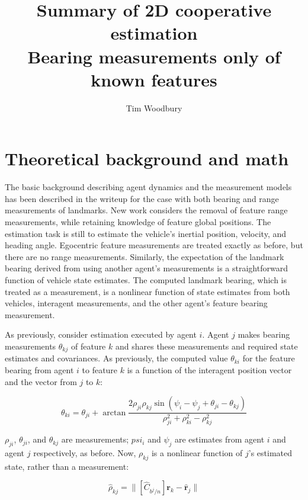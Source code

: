 \documentclass{aiaa-tc}
\title{Summary of 2D cooperative estimation \\ \large{Bearing measurements only of known features}}
\author{Tim Woodbury}
\newcommand{\B}[1]{\textbf{#1}} %
\begin{document}
\maketitle

\section{Theoretical background and math}

The basic background describing agent dynamics and the measurement models has been described in the writeup for the case with both bearing and range measurements of landmarks. New work considers the removal of feature range measurements, while retaining knowledge of feature global positions. The estimation task is still to estimate the vehicle's inertial position, velocity, and heading angle. Egocentric feature measurements are treated exactly as before, but there are no range measurements. Similarly, the expectation of the landmark bearing derived from using another agent's measurements is a straightforward function of vehicle state estimates. The computed landmark bearing, which is treated as a measurement, is a nonlinear function of state estimates from both vehicles, interagent measurements, and the other agent's feature bearing measurement.

As previously, consider estimation executed by agent $i$. Agent $j$ makes bearing measurements $\theta_{kj}$ of feature $k$ and shares these measurements and required state estimates and covariances. As previously, the computed value $\theta_{ki}$ for the feature bearing from agent $i$ to feature $k$ is a function of the interagent position vector and the vector from $j$ to $k$:

\begin{equation}
\theta_{ki} = \theta_{ji} + \arctan{\frac{ 2\rho_{ji}\rho_{kj}\sin{(\psi_i - \psi_j + \theta_{ji} - \theta_{kj})} }{ \rho_{ji}^2 + \rho_{ki}^2 - \rho_{kj}^2 } }
\label{eq:thetaki}
\end{equation}

$\rho_{ji}$, $\theta_{ji}$, and $\theta_{kj}$ are measurements; $psi_i$ and $\psi_j$ are estimates from agent $i$ and agent $j$ respectively, as before. Now, $\rho_{kj}$ is a nonlinear function of $j$'s estimated state, rather than a measurement:

\begin{equation}
\hat{\rho}_{kj} = \| [\hat{C}_{b^j/n}]\B{r}_k - \hat{\B{r}}_j \|
\label{eq:rhokj}
\end{equation}
\end{document}
